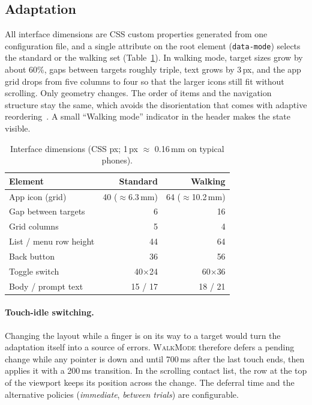 \documentclass[sigconf,nonacm]{acmart}
\newcommand{\WM}{\textsc{WalkMode}}
\begin{document}
\subsection{Adaptation}
All interface dimensions are CSS custom properties generated from one configuration file, and a single attribute on the root element (\texttt{data-mode}) selects the standard or the walking set (Table~\ref{tab:sizes}). In walking mode, target sizes grow by about 60\%, gaps between targets roughly triple, text grows by 3\,px, and the app grid drops from five columns to four so that the larger icons still fit without scrolling. Only geometry changes. The order of items and the navigation structure stay the same, which avoids the disorientation that comes with adaptive reordering~\cite{findlater2004menus}. A small ``Walking mode'' indicator in the header makes the state visible.

\begin{table}[t]
\caption{Interface dimensions (CSS px; 1\,px $\approx$ 0.16\,mm on typical phones).}
\label{tab:sizes}
\small
\begin{tabular}{@{}lrr@{}}
\toprule
Element & Standard & Walking \\
\midrule
App icon (grid) & 40 ($\approx$6.3\,mm) & 64 ($\approx$10.2\,mm) \\
Gap between targets & 6 & 16 \\
Grid columns & 5 & 4 \\
List / menu row height & 44 & 64 \\
Back button & 36 & 56 \\
Toggle switch & 40$\times$24 & 60$\times$36 \\
Body / prompt text & 15 / 17 & 18 / 21 \\
\bottomrule
\end{tabular}
\end{table}

\paragraph{Touch-idle switching.} Changing the layout while a finger is on its way to a target would turn the adaptation itself into a source of errors. \WM{} therefore defers a pending change while any pointer is down and until 700\,ms after the last touch ends, then applies it with a 200\,ms transition. In the scrolling contact list, the row at the top of the viewport keeps its position across the change. The deferral time and the alternative policies (\emph{immediate}, \emph{between trials}) are configurable.
\end{document}
